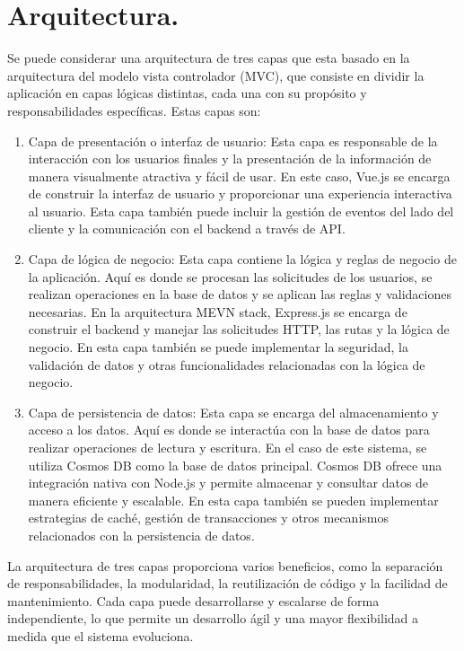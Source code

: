 \section{Arquitectura.}	

Se puede considerar una arquitectura de tres capas que esta basado en la arquitectura del modelo vista controlador (MVC), que consiste en dividir la aplicación en capas lógicas distintas, cada una con su propósito y responsabilidades específicas. Estas capas son:

\begin{enumerate}
\item Capa de presentación o interfaz de usuario: Esta capa es responsable de la interacción con los usuarios finales y la presentación de la información de manera visualmente atractiva y fácil de usar. En este caso, Vue.js se encarga de construir la interfaz de usuario y proporcionar una experiencia interactiva al usuario. Esta capa también puede incluir la gestión de eventos del lado del cliente y la comunicación con el backend a través de API.

\item Capa de lógica de negocio: Esta capa contiene la lógica y reglas de negocio de la aplicación. Aquí es donde se procesan las solicitudes de los usuarios, se realizan operaciones en la base de datos y se aplican las reglas y validaciones necesarias. En la arquitectura MEVN stack, Express.js se encarga de construir el backend y manejar las solicitudes HTTP, las rutas y la lógica de negocio. En esta capa también se puede implementar la seguridad, la validación de datos y otras funcionalidades relacionadas con la lógica de negocio.

\item Capa de persistencia de datos: Esta capa se encarga del almacenamiento y acceso a los datos. Aquí es donde se interactúa con la base de datos para realizar operaciones de lectura y escritura. En el caso de este sistema, se utiliza Cosmos DB como la base de datos principal. Cosmos DB ofrece una integración nativa con Node.js y permite almacenar y consultar datos de manera eficiente y escalable. En esta capa también se pueden implementar estrategias de caché, gestión de transacciones y otros mecanismos relacionados con la persistencia de datos.

\end{enumerate}

La arquitectura de tres capas proporciona varios beneficios, como la separación de responsabilidades, la modularidad, la reutilización de código y la facilidad de mantenimiento. Cada capa puede desarrollarse y escalarse de forma independiente, lo que permite un desarrollo ágil y una mayor flexibilidad a medida que el sistema evoluciona.

